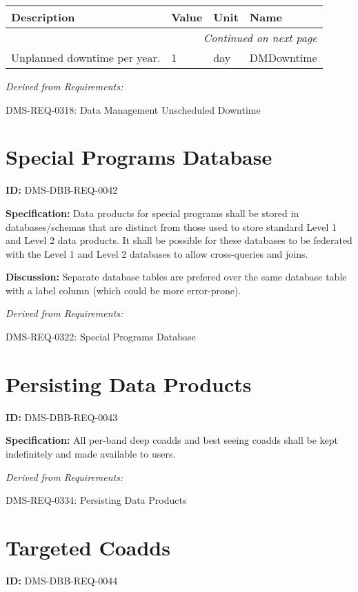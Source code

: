 \documentclass[SE,toc,lsstdraft]{lsstdoc}
\makeatletter
\newcommand{\paramname}[1]{\hspace{0pt}#1}
\newcommand{\unitname}[1]{\hspace{0pt}#1}
\newenvironment{parameters}[0]{%
\setlength\LTleft{0pt}
\setlength\LTright{\fill}
\begin{small}
\begin{longtable}[]{|p{0.49\textwidth}|l|p{0.6in}|p{1.70in}@{}|}

\hline \textbf{Description} & \textbf{Value} & \textbf{Unit} & \textbf{Name} \\ \hline
\endhead

\hline \multicolumn{4}{r}{\emph{Continued on next page}} \\
\endfoot

\hline\hline
\endlastfoot
}{%
\hline
\end{longtable}
\end{small}
}
\makeatother
\begin{document}
\begin{parameters}
Unplanned downtime per year.
&
1
&
\unitname{%
day
}
&
\paramname{%
DMDowntime
} \\\hline
\end{parameters}

\emph{Derived from Requirements:}

DMS-REQ-0318:
Data Management Unscheduled Downtime \newline

\section{Special Programs Database}

\label{DMS-DBB-REQ-0042}
\textbf{ID:} DMS-DBB-REQ-0042

\textbf{Specification:}
Data products for special programs shall be stored in databases/schemas that are distinct from those used to store standard Level 1 and Level 2 data products. It shall be possible for these databases to be federated with the Level 1 and Level 2 databases to allow cross-queries and joins.

\textbf{Discussion:}
Separate database tables are prefered over the same database table with a label column (which could be more error-prone).

\emph{Derived from Requirements:}

DMS-REQ-0322:
Special Programs Database \newline

\section{Persisting Data Products}

\label{DMS-DBB-REQ-0043}
\textbf{ID:} DMS-DBB-REQ-0043

\textbf{Specification:}
All per-band deep coadds and best seeing coadds shall be kept indefinitely and made available to users.

\emph{Derived from Requirements:}

DMS-REQ-0334:
Persisting Data Products \newline

\section{Targeted Coadds}

\label{DMS-DBB-REQ-0044}
\textbf{ID:} DMS-DBB-REQ-0044
\end{document}
